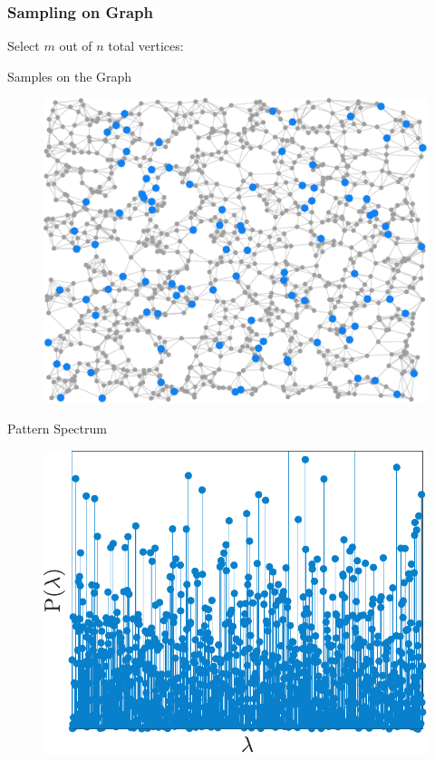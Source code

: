\documentclass[11pts]{beamer}
\begin{document}
\begin{frame}%
\frametitle{Sampling on Graph}

Select $m$ out of $n$ total vertices:


\vspace*{15px}
\begin{minipage}{0.5\textwidth}
\centering
Samples on the Graph
\begin{figure}
    \centering
 \includegraphics[scale=0.5]{IM/Samplig.pdf}
\end{figure}
    \end{minipage}
    \hfill
    \begin{minipage}{0.45\textwidth}
    \vspace*{0.5cm}
    \centering
       Pattern Spectrum
  \begin{figure}
     \centering
     \includegraphics[scale=0.37]{IM/Samplig_RAND.pdf}
 \end{figure}
    \end{minipage}

 
 
\end{frame}
\end{document}
